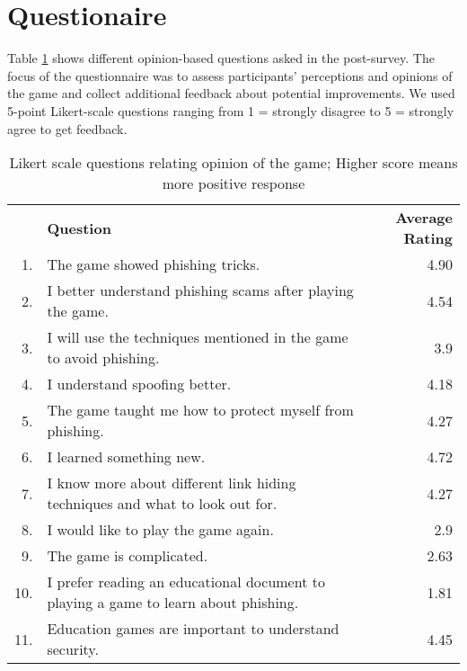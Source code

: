 \section{Questionaire}
Table \ref{tab:game_questions} shows different opinion-based questions asked in the post-survey. The focus of the questionnaire was to assess participants' perceptions and opinions of the game and collect additional feedback about potential improvements.  We used 5-point Likert-scale questions ranging from 1 = strongly disagree to 5 = strongly agree to get feedback.

\begin{table}[!ht]
    \centering
    \begin{tabular}{|r p{} r|}
        \hline
            & \textbf{Question}                                                                   & \textbf{Average Rating} \\
        1.  & The game showed phishing tricks.                                                    & 4.90                    \\
        2.  & I better understand phishing scams after playing the game.                          & 4.54                    \\
        3.  & I will use the techniques mentioned in the game to avoid phishing.                  & 3.9                     \\
        4.  & I understand spoofing better.                                                       & 4.18                    \\
        5.  & The game taught me how to protect myself from phishing.                             & 4.27                    \\
        6.  & I learned something new.                                                            & 4.72                    \\
        7.  & I know more about different link hiding techniques and what to look out for.        & 4.27                    \\
        \hline
        8.  & I would like to play the game again.                                                & 2.9                     \\
        9.  & The game is complicated.                                                            & 2.63                    \\
        10. & I prefer reading an educational document to playing a game to learn about phishing. & 1.81                    \\
        11. & Education games are important to understand security.                               & 4.45                    \\
        \hline
    \end{tabular}
    \caption[Likert scale questions relating opinion of the game]{Likert scale questions relating opinion of the game; Higher score means more positive response}
    \label{tab:game_questions}
\end{table}


